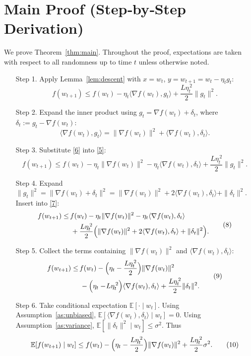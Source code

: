 \documentclass{article}
\newcommand{\E}{\mathbb{E}}
\begin{document}
\section*{Main Proof (Step‑by‑Step Derivation)}
We prove Theorem~\ref{thm:main}.  Throughout the proof, expectations are taken
with respect to all randomness up to time $t$ unless otherwise noted.

\begin{enumerate}
\item[Step 1.] Apply Lemma~\ref{lem:descent} with $x=w_t$, $y=w_{t+1}=w_t-\eta_t g_t$:
\[
f(w_{t+1})\le f(w_t)-\eta_t\langle\nabla f(w_t),g_t\rangle
+\frac{L\eta_t^{\,2}}{2}\|g_t\|^2 .
\tag{5}
\]

\item[Step 2.] Expand the inner product using $g_t=\nabla f(w_t)+\delta_t$, where
$\delta_t:=g_t-\nabla f(w_t)$:
\[
\langle\nabla f(w_t),g_t\rangle
= \|\nabla f(w_t)\|^2+\langle\nabla f(w_t),\delta_t\rangle .
\tag{6}
\]

\item[Step 3.] Substitute \eqref{6} into \eqref{5}:
\[
f(w_{t+1})\le f(w_t)-\eta_t\|\nabla f(w_t)\|^2
-\eta_t\langle\nabla f(w_t),\delta_t\rangle
+\frac{L\eta_t^{\,2}}{2}\|g_t\|^2 .
\tag{7}
\]

\item[Step 4.] Expand $\|g_t\|^2=\|\nabla f(w_t)+\delta_t\|^2
= \|\nabla f(w_t)\|^2+2\langle\nabla f(w_t),\delta_t\rangle+\|\delta_t\|^2$.
Insert into \eqref{7}:
\[
\begin{aligned}
f(w_{t+1})\le &\, f(w_t)-\eta_t\|\nabla f(w_t)\|^2
-\eta_t\langle\nabla f(w_t),\delta_t\rangle \\
&\;+\frac{L\eta_t^{\,2}}{2}\Bigl(\|\nabla f(w_t)\|^2
+2\langle\nabla f(w_t),\delta_t\rangle+\|\delta_t\|^2\Bigr) .
\end{aligned}
\tag{8}
\]

\item[Step 5.] Collect the terms containing $\|\nabla f(w_t)\|^2$ and
$\langle\nabla f(w_t),\delta_t\rangle$:
\[
\begin{aligned}
f(w_{t+1})\le &\, f(w_t)
-\Bigl(\eta_t-\frac{L\eta_t^{\,2}}{2}\Bigr)\|\nabla f(w_t)\|^2 \\
&\;-\Bigl(\eta_t-\!L\eta_t^{\,2}\Bigr)\langle\nabla f(w_t),\delta_t\rangle
+\frac{L\eta_t^{\,2}}{2}\|\delta_t\|^2 .
\end{aligned}
\tag{9}
\]

\item[Step 6.] Take conditional expectation $\E[\cdot\mid w_t]$.
Using Assumption~\ref{as:unbiased}, $\E[\langle\nabla f(w_t),\delta_t\rangle\mid w_t]=0$.
Using Assumption~\ref{as:variance}, $\E[\|\delta_t\|^2\mid w_t]\le\sigma^2$.
Thus
\[
\E\!\left[f(w_{t+1})\mid w_t\right]
\le f(w_t)-\Bigl(\eta_t-\frac{L\eta_t^{\,2}}{2}\Bigr)\|\nabla f(w_t)\|^2
+\frac{L\eta_t^{\,2}}{2}\sigma^2 .
\tag{10}
\]


\end{enumerate}
\end{document}
